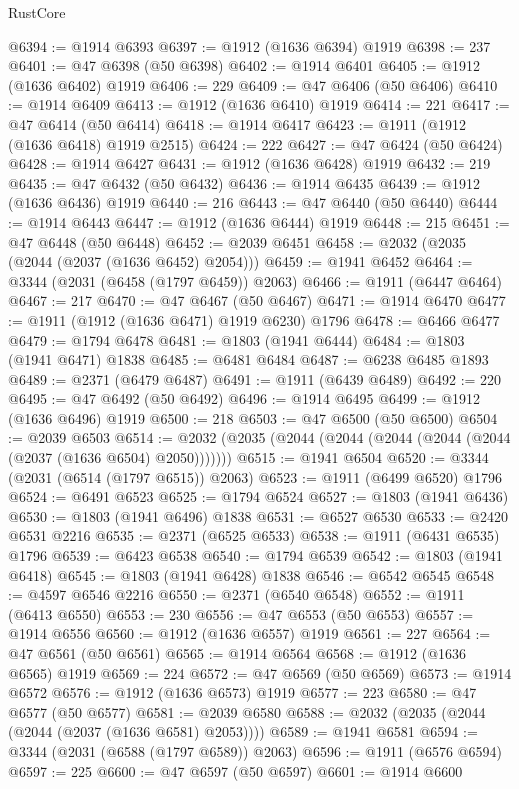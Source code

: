 \begin{lexlean}{RustCore}
\begin{coremodule}
@6394 := @1914 @6393
@6397 := @1912 (@1636 @6394) @1919
@6398 := 237
@6401 := @47 @6398 (@50 @6398)
@6402 := @1914 @6401
@6405 := @1912 (@1636 @6402) @1919
@6406 := 229
@6409 := @47 @6406 (@50 @6406)
@6410 := @1914 @6409
@6413 := @1912 (@1636 @6410) @1919
@6414 := 221
@6417 := @47 @6414 (@50 @6414)
@6418 := @1914 @6417
@6423 := @1911 (@1912 (@1636 @6418) @1919 @2515)
@6424 := 222
@6427 := @47 @6424 (@50 @6424)
@6428 := @1914 @6427
@6431 := @1912 (@1636 @6428) @1919
@6432 := 219
@6435 := @47 @6432 (@50 @6432)
@6436 := @1914 @6435
@6439 := @1912 (@1636 @6436) @1919
@6440 := 216
@6443 := @47 @6440 (@50 @6440)
@6444 := @1914 @6443
@6447 := @1912 (@1636 @6444) @1919
@6448 := 215
@6451 := @47 @6448 (@50 @6448)
@6452 := @2039 @6451
@6458 := @2032 (@2035 (@2044 (@2037 (@1636 @6452) @2054)))
@6459 := @1941 @6452
@6464 := @3344 (@2031 (@6458 (@1797 @6459)) @2063)
@6466 := @1911 (@6447 @6464)
@6467 := 217
@6470 := @47 @6467 (@50 @6467)
@6471 := @1914 @6470
@6477 := @1911 (@1912 (@1636 @6471) @1919 @6230) @1796
@6478 := @6466 @6477
@6479 := @1794 @6478
@6481 := @1803 (@1941 @6444)
@6484 := @1803 (@1941 @6471) @1838
@6485 := @6481 @6484
@6487 := @6238 @6485 @1893
@6489 := @2371 (@6479 @6487)
@6491 := @1911 (@6439 @6489)
@6492 := 220
@6495 := @47 @6492 (@50 @6492)
@6496 := @1914 @6495
@6499 := @1912 (@1636 @6496) @1919
@6500 := 218
@6503 := @47 @6500 (@50 @6500)
@6504 := @2039 @6503
@6514 := @2032 (@2035 (@2044 (@2044 (@2044 (@2044 (@2044 (@2037 (@1636 @6504) @2050)))))))
@6515 := @1941 @6504
@6520 := @3344 (@2031 (@6514 (@1797 @6515)) @2063)
@6523 := @1911 (@6499 @6520) @1796
@6524 := @6491 @6523
@6525 := @1794 @6524
@6527 := @1803 (@1941 @6436)
@6530 := @1803 (@1941 @6496) @1838
@6531 := @6527 @6530
@6533 := @2420 @6531 @2216
@6535 := @2371 (@6525 @6533)
@6538 := @1911 (@6431 @6535) @1796
@6539 := @6423 @6538
@6540 := @1794 @6539
@6542 := @1803 (@1941 @6418)
@6545 := @1803 (@1941 @6428) @1838
@6546 := @6542 @6545
@6548 := @4597 @6546 @2216
@6550 := @2371 (@6540 @6548)
@6552 := @1911 (@6413 @6550)
@6553 := 230
@6556 := @47 @6553 (@50 @6553)
@6557 := @1914 @6556
@6560 := @1912 (@1636 @6557) @1919
@6561 := 227
@6564 := @47 @6561 (@50 @6561)
@6565 := @1914 @6564
@6568 := @1912 (@1636 @6565) @1919
@6569 := 224
@6572 := @47 @6569 (@50 @6569)
@6573 := @1914 @6572
@6576 := @1912 (@1636 @6573) @1919
@6577 := 223
@6580 := @47 @6577 (@50 @6577)
@6581 := @2039 @6580
@6588 := @2032 (@2035 (@2044 (@2044 (@2037 (@1636 @6581) @2053))))
@6589 := @1941 @6581
@6594 := @3344 (@2031 (@6588 (@1797 @6589)) @2063)
@6596 := @1911 (@6576 @6594)
@6597 := 225
@6600 := @47 @6597 (@50 @6597)
@6601 := @1914 @6600

\end{coremodule}
\end{lexlean}
